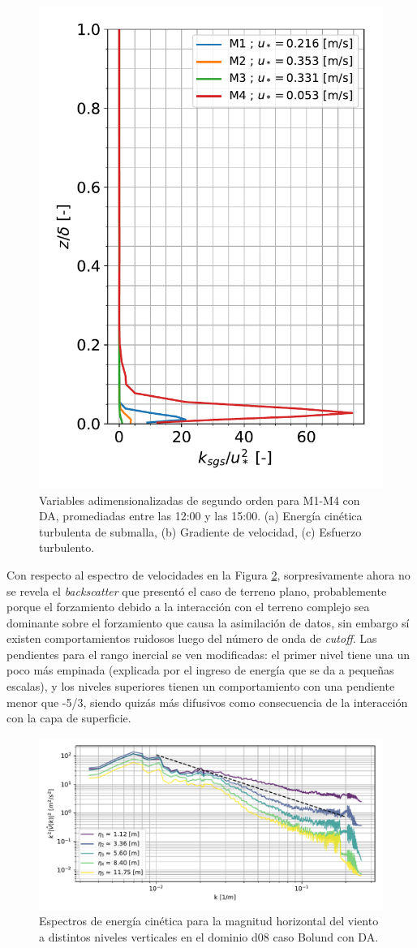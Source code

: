 \begin{figure}[H]
\begin{center}
		\includegraphics[height=0.5\linewidth,page=3,trim={12mm 5mm 3mm 0mm},clip]{Imagenes/06/bol_da/second_order_mean}%
	\end{center}
	\vspace{-5mm}
	\caption{Variables adimensionalizadas de segundo orden para M1-M4 con DA, promediadas entre las 12:00 y las 15:00. (a) Energía cinética turbulenta de submalla, (b) Gradiente de velocidad, (c) Esfuerzo turbulento. }
	\label{fig:06_bol_da_mean_secondorder}
\end{figure}
Con respecto al espectro de velocidades en la Figura \ref{fig:06_bol_da_spectrum}, sorpresivamente ahora no se revela el \emph{backscatter} que presentó el caso de terreno plano, probablemente porque el forzamiento debido a la interacción con el terreno complejo sea dominante sobre el forzamiento que causa la asimilación de datos, sin embargo sí existen comportamientos ruidosos luego del número de onda de \emph{cutoff}. Las pendientes para el rango inercial se ven modificadas: el primer nivel tiene una un poco más empinada (explicada por el ingreso de energía que se da a pequeñas escalas), y los niveles superiores tienen un comportamiento con una pendiente menor que -5/3, siendo quizás más difusivos como consecuencia de la interacción con la capa de superficie.
\newpage
\begin{figure}[H]
	\centering
	\includegraphics[width=1.0\linewidth,page=1,trim={3mm 5mm 3mm 3mm},clip]{Imagenes/06/bol_da/spectra}%
	\caption{Espectros de energía cinética para la magnitud horizontal del viento a distintos niveles verticales en el dominio d08 caso Bolund con DA.}
	\label{fig:06_bol_da_spectrum}
\end{figure}
